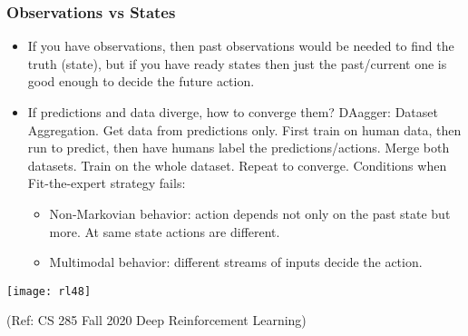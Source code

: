 \begin{frame}[fragile]\frametitle{Observations vs States}

\begin{itemize}
\item If you have observations, then past observations would be needed to find the truth (state), but if you have ready states then just the past/current one is good enough to decide the future action.
\item If predictions and data diverge, how to converge them? DAagger: Dataset Aggregation. Get data from predictions only. First train on human data, then run to predict, then have humans label the predictions/actions. Merge both datasets. Train on the whole dataset. Repeat to converge.
Conditions when Fit-the-expert strategy fails:
\begin{itemize}
\item Non-Markovian behavior: action depends not only on the past state but more. At same state actions are different.
\item 	Multimodal behavior: different streams of inputs decide the action.
\end{itemize}

\end{itemize}


\begin{center}
\texttt{[image: rl48]}
\end{center}


{\tiny (Ref: CS 285 Fall 2020 Deep Reinforcement Learning)}

\end{frame}